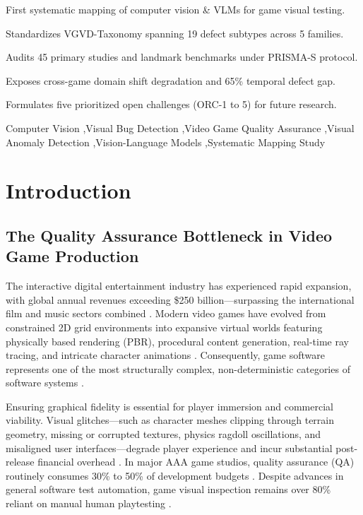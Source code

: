 \documentclass[preprint,12pt,3p]{elsarticle}
\begin{document}
\begin{frontmatter}
\begin{highlights}
\item First systematic mapping of computer vision \& VLMs for game visual testing.
\item Standardizes VGVD-Taxonomy spanning 19 defect subtypes across 5 families.
\item Audits 45 primary studies and landmark benchmarks under PRISMA-S protocol.
\item Exposes cross-game domain shift degradation and 65\% temporal defect gap.
\item Formulates five prioritized open challenges (ORC-1 to 5) for future research.
\end{highlights}

\begin{keyword}
Computer Vision \sep Visual Bug Detection \sep Video Game Quality Assurance \sep Visual Anomaly Detection \sep Vision-Language Models \sep Systematic Mapping Study
\end{keyword}

\end{frontmatter}

\newpage
\tableofcontents
\newpage

\section{Introduction}

\subsection{The Quality Assurance Bottleneck in Video Game Production}
The interactive digital entertainment industry has experienced rapid expansion, with global annual revenues exceeding \$250 billion---surpassing the international film and music sectors combined \cite{taesiri2025videogameqa, politowski2021survey}. Modern video games have evolved from constrained 2D grid environments into expansive virtual worlds featuring physically based rendering (PBR), procedural content generation, real-time ray tracing, and intricate character animations \cite{kovacs2026stateaware}. Consequently, game software represents one of the most structurally complex, non-deterministic categories of software systems \cite{politowski2021survey, albaghajati2023gameautomated}.

Ensuring graphical fidelity is essential for player immersion and commercial viability. Visual glitches---such as character meshes clipping through terrain geometry, missing or corrupted textures, physics ragdoll oscillations, and misaligned user interfaces---degrade player experience and incur substantial post-release financial overhead \cite{yu2026refglitch, yi2025hybrid}. In major AAA game studios, quality assurance (QA) routinely consumes 30\% to 50\% of development budgets \cite{taesiri2025videogameqa, svensson2025industrygametesting}. Despite advances in general software test automation, game visual inspection remains over 80\% reliant on manual human playtesting \cite{svensson2025industrygametesting}.
\end{document}
